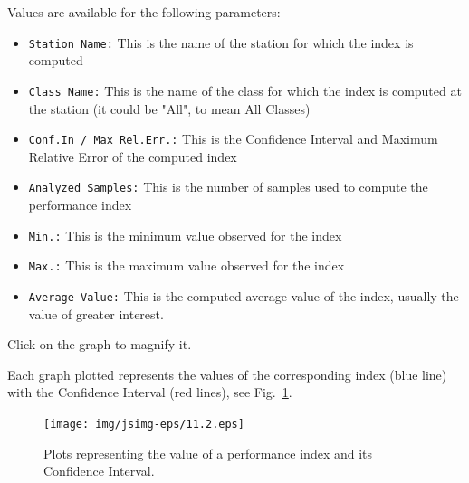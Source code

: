 Values are available for the following parameters:
\begin{itemize}

\item \texttt{Station Name:} This is the name of the station for
which the index is computed \item \texttt{Class Name:} This is the
name of the class for which the index is computed at the station
(it could be "All", to mean All Classes) \item \texttt{Conf.In /
Max Rel.Err.:} This is the Confidence Interval and Maximum
Relative Error of the computed index \item \texttt{Analyzed
Samples:} This is the number of samples used to compute the
performance index \item  \texttt{Min.:} This is the minimum value
observed for the index \item \texttt{Max.:} This is the maximum
value observed for the index \item \texttt{Average Value:} This is
the computed average value of the index, usually the value of
greater interest.
\end{itemize}

Click on the graph to magnify it.

Each graph plotted represents the values of the corresponding
index (blue line) with the Confidence Interval (red lines), see
Fig.~\ref{fig:valconfint}.
\begin{figure}[htb]
    \begin{center}
        \texttt{[image: img/jsimg-eps/11.2.eps]}
    \end{center}
    \caption{Plots representing the value of a performance index and its
    Confidence Interval.}
    \label{fig:valconfint}
\end{figure}\\

